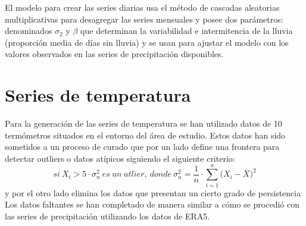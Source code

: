 

El modelo para crear las series diarias usa el método de cascadas aleatorias multiplicativas \cite{Molnar} para 
desagregar las series mensuales y posee dos parámetros: denominados $\sigma_2$ y $\beta$
que determinan la variabilidad e intermitencia de la lluvia (proporción media de días sin lluvia) y se usan para 
ajustar el modelo con los valores observados en las series de precipitación disponibles.




\section{Series de temperatura}
\label{tempint}
Para la generación de las series de temperatura se han utilizado datos de 10 termómetros situados en el entorno del área de 
estudio.
Estos datos han sido sometidos a un proceso de curado que por un lado define una frontera para detectar outliers o datos
 atípicos siguiendo el siguiente criterio:
\begin{equation}
  si~X_i>5\cdot\sigma^2_n~es~un~utlier,~donde~\sigma^2_n=\frac{1}{n}\cdot\sum^n_{i=1}\bigg(X_i-\bar{X}\bigg)^2
\end{equation}
y por el otro lado elimina los datos que presentan un cierto grado de persistencia \cite{Estevez}
Los datos faltantes se han completado de manera similar a cómo se procedió con las series 
de precipitación utilizando los datos de ERA5.


